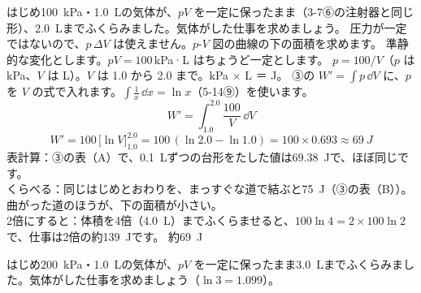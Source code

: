 \label{ph:熱-2:ex4}
\begin{phreidai}
はじめ\qty{100}{kPa}・\qty{1.0}{L}の気体が、$pV$ を一定に保ったまま（3-7⑥の注射器と同じ形）、\qty{2.0}{L}までふくらみました。気体がした仕事を求めましょう。
\phbamen
圧力が一定ではないので、$p\,\Delta V$ は使えません。$p$-$V$ 図の曲線の下の面積を求めます。
\phmushi
準静的な変化とします。$pV=100$\,kPa·L はちょうど一定とします。
\phzu
$p=100/V$（$p$ は kPa、$V$ は L）。$V$ は 1.0 から 2.0 まで。kPa × L ＝ J。
\phriyu
③の $W'=\int p\,\dd V$ に、$p$ を $V$ の式で入れます。$\int\frac{1}{x}\,\dd x=\ln x$（5-14⑨）を使います。
\phtateru
\[W'=\int_{1.0}^{2.0}\frac{100}{V}\,\dd V\]
\phtoku
\[W'=100\,\bigl[\ln V\bigr]_{1.0}^{2.0}=100\,(\ln2.0-\ln1.0)=100\times0.693\approx\qty{69}{J}\]
\phtashikame
表計算：③の表（A）で、\qty{0.1}{L}ずつの台形をたした値は\qty{69.38}{J}で、ほぼ同じです。\\
くらべる：同じはじめとおわりを、まっすぐな道で結ぶと\qty{75}{J}（③の表（B））。曲がった道のほうが、下の面積が小さい。\\
2倍にすると：体積を4倍（\qty{4.0}{L}）までふくらませると、$100\ln4=2\times100\ln2$ で、仕事は2倍の約\qty{139}{J}です。
\kotae 約\qty{69}{J}
\end{phreidai}
\begin{jibun}
はじめ\qty{200}{kPa}・\qty{1.0}{L}の気体が、$pV$ を一定に保ったまま\qty{3.0}{L}までふくらみました。気体がした仕事を求めましょう（$\ln3=1.099$）。
\end{jibun}

